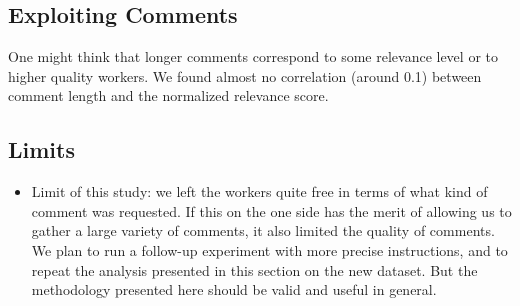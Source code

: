 \subsection{Exploiting Comments}
\label{sec:exploiting-comments}

One might think that longer comments correspond to some relevance
level or to higher quality workers. 
We found almost no correlation (around 0.1) between comment length and
the  normalized relevance score. 



\subsection{Limits}
\label{sec:limits}


\begin{itemize}
  \item Limit of this study: we left the workers quite free in terms of what kind of
    comment was requested. 
    If this on the one side has the merit of allowing us to gather a
    large variety of comments, it also limited the quality of
    comments.
    We plan to run a follow-up experiment with more precise
    instructions, and to repeat the analysis presented in this section
    on the new dataset. 
    But the methodology presented here should be valid and useful in general.
\end{itemize}

